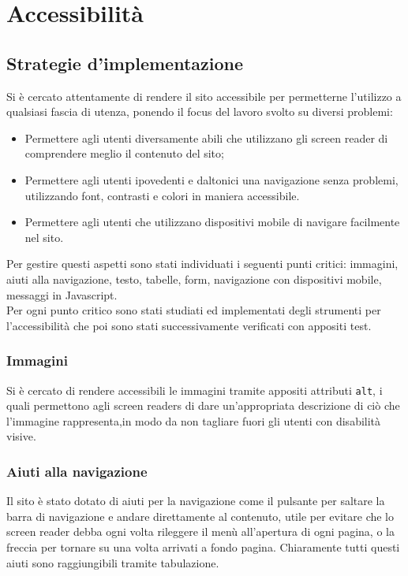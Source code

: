 \section{Accessibilità}
    \subsection{Strategie d'implementazione}
    Si è cercato attentamente di rendere il sito accessibile per permetterne l'utilizzo a qualsiasi fascia di utenza, ponendo il focus del lavoro svolto su diversi problemi:
    \begin{itemize}
        \item Permettere agli utenti diversamente abili che utilizzano gli screen reader di comprendere meglio il contenuto del sito;
        \item Permettere agli utenti ipovedenti e daltonici una navigazione senza problemi, utilizzando font, contrasti e colori in maniera accessibile.
        \item Permettere agli utenti che utilizzano dispositivi mobile di navigare facilmente nel sito.
    \end{itemize}
    Per gestire questi aspetti sono stati individuati i seguenti punti critici: immagini, aiuti alla navigazione, testo, tabelle, form, navigazione con dispositivi mobile, messaggi in Javascript.\\
    Per ogni punto critico sono stati studiati ed implementati degli strumenti per l'accessibilità che poi sono stati successivamente verificati con appositi test.
    \subsubsection{Immagini}
    Si è cercato di rendere accessibili le immagini tramite appositi attributi \texttt{alt}, i quali permettono agli screen readers di dare un'appropriata descrizione di ciò che l'immagine rappresenta,in modo da non tagliare fuori gli utenti con disabilità visive.
    \subsubsection{Aiuti alla navigazione}
    Il sito è stato dotato di aiuti per la navigazione come il pulsante per saltare la barra di navigazione e andare direttamente al contenuto, utile per evitare che lo screen reader debba ogni volta rileggere il menù all’apertura di ogni pagina, o la freccia per tornare su una volta arrivati a fondo pagina. Chiaramente tutti questi aiuti sono raggiungibili tramite tabulazione.
